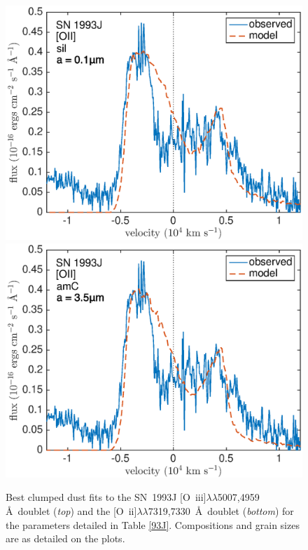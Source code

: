 \begin{figure}
\includegraphics[scale=0.4,clip=true, trim=0 0 40 20]{chapters/chapter6/figs/93J/clumped/OII_sil}
\includegraphics[scale=0.4,clip=true, trim=30 0 40 20]{chapters/chapter6/figs/93J/clumped/OII_amC}
\caption{Best clumped dust fits to the SN~1993J [O~{\sc iii}]$\lambda\lambda$5007,4959 \AA\ doublet ({\em top}) and the [O~{\sc ii}]$\lambda\lambda$7319,7330~\AA\ doublet  ({\em bottom}) for the parameters detailed in Table \ref{93J}.  Compositions and grain sizes are as detailed on the plots.}
\label{93J_clumped}
\end{figure}

